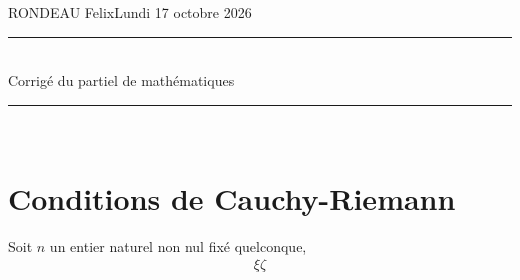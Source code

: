 \documentclass[a4paper,10pt]{article}
\newcommand{\assignmentauthor}{RONDEAU Felix}
\newcommand{\assignmentdate}{Lundi 17 octobre 2026}
\newcommand{\assignmenttitle}{Corrigé du partiel de mathématiques}
\newcommand{\question}{\item}
\newenvironment{exercise}[1][Exercice]{\section*{#1}\begin{questions}}{\end{questions}}
\begin{document}
\thispagestyle{empty}
\vspace*{-1cm}
\noindent\assignmentauthor \hfill \assignmentdate

\begin{center}
	\rule[2ex]{\textwidth}{1pt}\\
	{\Large{\assignmenttitle}}
\end{center}
\rule[2ex]{\textwidth}{1pt}\\
\title{}
\author{}
\date{}

\begin{exercise}[Conditions de Cauchy-Riemann]
	\question Soit $n$ un entier naturel non nul fixé quelconque,
	\begin{align*}
	\xi\zeta
	\end{align*}

\end{exercise}
\end{document}
